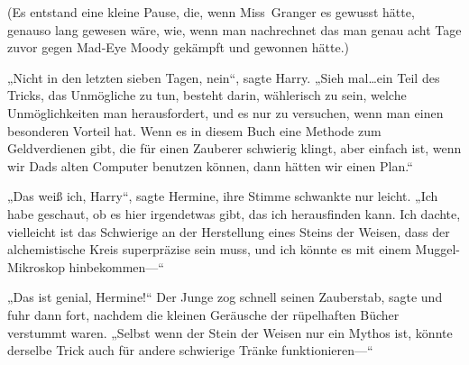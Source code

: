 (Es entstand eine kleine Pause, die, wenn Miss~Granger es gewusst hätte, genauso lang gewesen wäre, wie, wenn man nachrechnet das man genau acht Tage zuvor gegen Mad-Eye Moody gekämpft und gewonnen hätte.)

„Nicht in den letzten sieben Tagen, nein“, sagte Harry. „Sieh mal…ein Teil des Tricks, das Unmögliche zu tun, besteht darin, wählerisch zu sein, welche Unmöglichkeiten man herausfordert, und es nur zu versuchen, wenn man einen besonderen Vorteil hat. Wenn es in diesem Buch eine Methode zum Geldverdienen gibt, die für einen Zauberer schwierig klingt, aber einfach ist, wenn wir Dads alten Computer benutzen können, dann hätten wir einen Plan.“

„Das weiß ich, Harry“, sagte Hermine, ihre Stimme schwankte nur leicht. „Ich habe geschaut, ob es hier irgendetwas gibt, das ich herausfinden kann. Ich dachte, vielleicht ist das Schwierige an der Herstellung eines Steins der Weisen, dass der alchemistische Kreis superpräzise sein muss, und ich könnte es mit einem Muggel-Mikroskop hinbekommen—“

„Das ist genial, Hermine!“ Der Junge zog schnell seinen Zauberstab, sagte  und fuhr dann fort, nachdem die kleinen Geräusche der rüpelhaften Bücher verstummt waren. „Selbst wenn der Stein der Weisen nur ein Mythos ist, könnte derselbe Trick auch für andere schwierige Tränke funktionieren—“

